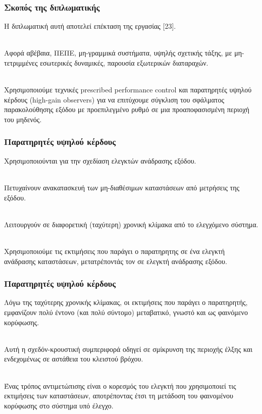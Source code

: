 \documentclass{beamer}
\begin{document}
    \begin{frame}
        \frametitle{Σκοπός της διπλωματικής}
        Η διπλωματική αυτή αποτελεί επέκταση της εργασίας [23].\\~\
        
        \pause
        Αφορά αβέβαια, ΠΕΠΕ, μη-γραμμικά συστήματα, υψηλής σχετικής τάξης, με μη-τετριμμένες εσωτερικές δυναμικές, παρουσία εξωτερικών διαταραχών.\\~\
        
        \pause
        Χρησιμοποιούμε τεχνικές \textlatin{prescribed performance control} και παρατηρητές υψηλού κέρδους (\textlatin{high-gain observers}) για να επιτύχουμε σύγκλιση του σφάλματος παρακολούθησης εξόδου με προεπιλεγμένο ρυθμό σε μια προαποφασισμένη περιοχή του μηδενός.
    \end{frame}

    \begin{frame}
        \frametitle{Παρατηρητές υψηλού κέρδους}
        Χρησιμοποιούνται για την σχεδίαση ελεγκτών ανάδρασης εξόδου.\\~\
        
        \pause
        Πετυχαίνουν ανακατασκευή των μη-διαθέσιμων καταστάσεων από μετρήσεις της εξόδου.\\~\
        
        \pause
        Λειτουργούν σε διαφορετική (ταχύτερη) χρονική κλίμακα από το ελεγχόμενο σύστημα.\\~\
        
        \pause
        Χρησιμοποιούμε τις εκτιμήσεις που παράγει ο παρατηρητης σε ένα ελεγκτή ανάδρασης καταστάσεων, μετατρέποντάς τον σε ελεγκτή ανάδρασης εξόδου.
        
    \end{frame}

    \begin{frame}
        \frametitle{Παρατηρητές υψηλού κέρδους}
        Λόγω της ταχύτερης χρονικής κλίμακας, οι εκτιμήσεις που παράγει ο παρατηρητής, εμφανίζουν πολύ έντονο (και πολύ σύντομο) μεταβατικό, γνωστό και ως φαινόμενο κορύφωσης.\\~\
        
        \pause
        Αυτή η σχεδόν-κρουστική συμπεριφορά οδηγεί σε σμίκρυνση της περιοχής έλξης και ενδεχομένως σε αστάθεια του κλειστού βρόχου.\\~\
        
        \pause
        Ένας τρόπος αντιμετώπισης είναι ο κορεσμός του ελεγκτή που χρησιμοποιεί τις εκτιμήσεις των καταστάσεων, αποτρέποντας έτσι τη μετάδοση του φαινομένου κορύφωσης στο σύστημα υπό έλεγχο.
    \end{frame}
\end{document}
